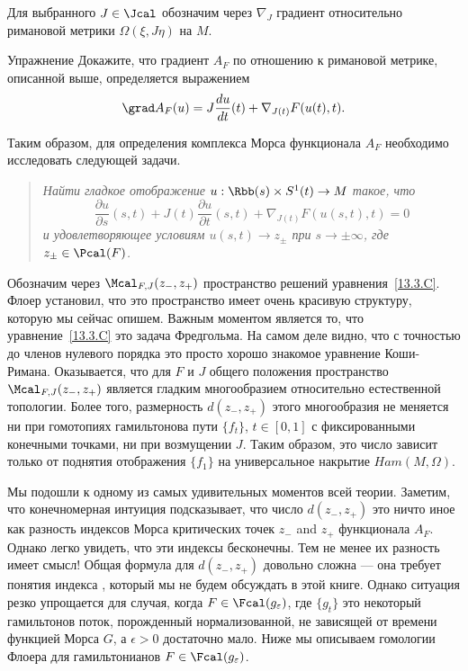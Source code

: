 Для выбранного $J\in\Jcal$ обозначим через $\nabla_{J}$ градиент
относительно римановой метрики $\Omega(\xi,J\eta)$ на $M$.
\begin{ex}{Упражнение}\label{13.3.B}
  Докажите, что градиент $A_{F}$ по отношению к римановой метрике,
  описанной выше, определяется выражением 
  \[
  \grad A_{F}(u)=J\frac{\d u}{\d t}(t)+\nabla_{J(t)}F(u(t),t).
  \]
\end{ex}
Таким образом, для определения комплекса Морса функционала $A_{F}$
необходимо исследовать  следующей задачи.
\begin{quote}\em
  Найти гладкое отображение $u : \Rbb(s)\times S^{1}(t)\to M$ такое,
  что
  \begin{equation}\label{13.3.C}
    \frac{\partial u}{\partial s}(s,t) +
    J(t)\frac{\partial u}{\partial t}(s,t) +
    \nabla_{J(t)}F(u(s,t),t) = 0
  \end{equation}
  и удовлетворяющее условиям $u(s,t)\to z_{\pm}$ при $s\to\pm\infty$,
  где $z_{\pm}\in\Pcal(F)$.
\end{quote}
Обозначим через $\Mcal_{F,J}(z_{-},z_{+})$ пространство решений
уравнения~\ref{13.3.C}. 
Флоер установил, что это пространство имеет очень красивую структуру,
которую мы сейчас опишем.
Важным моментом является то, что уравнение~\ref{13.3.C} это задача Фредгольма.
На самом деле видно, что с точностью до членов нулевого порядка это
просто хорошо знакомое уравнение Коши-Римана. 
Оказывается, что для $F$ и $J$ общего положения пространство
$\Mcal_{F,J}(z_{-},z_{+})$ является гладким многообразием относительно
естественной топологии. 
Более того, размерность $d(z_{-}, z_{+})$ этого многообразия не
меняется ни при гомотопиях гамильтонова пути $\{f_{t}\}$, $t\in [0,1]$
с фиксированными конечными точками, ни при возмущении $J$.
Таким образом, это число зависит только от поднятия отображения
$\{f_{1}\}$ на универсальное накрытие $Ham(M, \Omega)$.

Мы подошли к одному из самых удивительных моментов всей теории.
Заметим, что конечномерная интуиция подсказывает, что число $d(z_{-},
z_{+})$ это ничто иное как разность индексов Морса критических точек
$z_{-}$ and $z_{+}$ функционала $A_{F}$.
Однако легко увидеть, что эти индексы бесконечны.
Тем не менее их разность имеет смысл!
Общая формула для
$d(z_{-},z_{+})$ довольно сложна --- она требует понятия индекса
, который мы не будем обсуждать в этой книге.
Однако ситуация резко упрощается для случая, когда
$F\in\Fcal(g_{\epsilon})$, где $\{g_{t}\}$ это некоторый гамильтонов
поток, порожденный нормализованной, не зависящей от времени функцией
Морса $G$, а $\epsilon>0$ достаточно мало.
Ниже мы описываем гомологии Флоера для гамильтонианов
$F\in\Fcal(g_{\epsilon})$.

